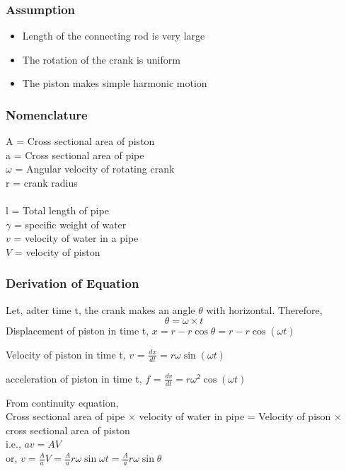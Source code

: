 \documentclass{article}
\begin{document}
  \subsubsection*{Assumption}
  \begin{itemize}
    \item Length of the connecting rod is very large 
    \item The rotation of the crank is uniform 
    \item The piston makes simple harmonic motion 
  \end{itemize}

  \subsubsection*{Nomenclature}

  \begin{multicols}{2}
    A = Cross sectional area of piston \\
    a = Cross sectional area of pipe \\
    $\omega$ = Angular velocity of rotating crank \\
    r = crank radius \\
    \\
    l = Total length of pipe \\
    $\gamma$ = specific weight of water \\
    $v$ = velocity of water in a pipe \\
    $V$ = velocity of piston \\
  \end{multicols}

  \subsubsection*{Derivation of Equation}
  Let, adter time t, the crank makes an angle $\theta$ with horizontal. Therefore, $$\theta = \omega \times t$$
  Displacement of piston in time t, $x = r -r \cos \theta = r - r \cos \left(\omega t\right)$

  Velocity of piston in time t, $v$ = $\frac{dx}{dt} = r\omega \sin \left(\omega t\right)$

  acceleration of piston in time t, $f$ = $\frac{dv}{dt} = r\omega^2 \cos \left(\omega t\right)$

  From continuity equation, \\
  Cross sectional area of pipe $\times$ velocity of water in pipe = Velocity of pison $\times$ cross sectional area of piston \\
  i.e., $av = AV$ \\
  or, $v = \frac{A}{a} V = \frac{A}{a} r \omega \sin \omega t = \frac{A}{a} r \omega \sin \theta $
\end{document}
